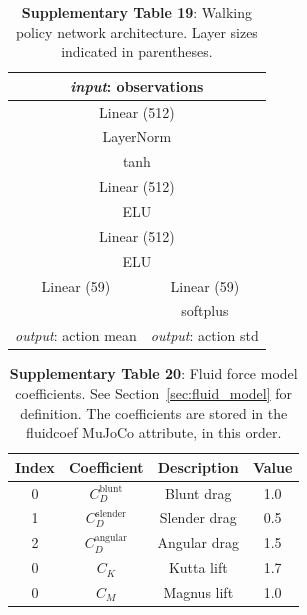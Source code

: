 \documentclass[sn-mathphys-num]{sn-jnl}%
\theoremstyle{thmstyleone}	%
\theoremstyle{thmstyletwo}	%
\theoremstyle{thmstylethree}	%
\begin{document}
\begin{appendices}
\begin{table}[htbp]
	\centering
	\small
	\caption{\textbf{Supplementary Table 19}:
		Walking policy network architecture. 
		Layer sizes indicated in parentheses.
	}
	\begin{tabular}{cc}
		\toprule
		\multicolumn{2}{c}{\textit{input}: observations}             \\
		\midrule
		\multicolumn{2}{c}{Linear (512)}        \\
		\multicolumn{2}{c}{LayerNorm}      \\
		\multicolumn{2}{c}{tanh}     \\
		\multicolumn{2}{c}{Linear (512)}      \\
		\multicolumn{2}{c}{ELU}       \\
		\multicolumn{2}{c}{Linear (512)}       \\
		\multicolumn{2}{c}{ELU}      \\
		\midrule
		Linear (59)     &  Linear (59)  \\
		&  softplus \\
		\textit{output}: action mean     &  \textit{output}: action std  \\
		\bottomrule
	\end{tabular}%
	\label{tab:s_19}%
\end{table}%




\begin{table}[htbp]
	\centering
	\small
	\caption{\textbf{Supplementary Table 20}:
		Fluid force model coefficients. 
		See Section~\ref{sec:fluid_model} for definition. 
		The coefficients are stored in the fluidcoef MuJoCo attribute, in this order.
	}
	\begin{tabular}{cccc}
		\toprule
		\textbf{Index}        &        \textbf{Coefficient}  & \textbf{Description}  & \textbf{Value}  \\
		\midrule
		0     &  $ C_D^{\text{blunt}} $     &  Blunt drag  & 1.0  \\
		1     &  $ C_D^{\text{slender}} $     &  Slender drag  & 0.5  \\
		2     &  $ C_D^{\text{angular}} $     &  Angular drag  & 1.5  \\
		0     &  $ C_K $     &  Kutta lift  & 1.7  \\
		0     &  $ C_M $     &  Magnus lift  & 1.0  \\
		\bottomrule
	\end{tabular}%
	\label{tab:s_20}%
\end{table}%



\end{appendices}
\end{document}
